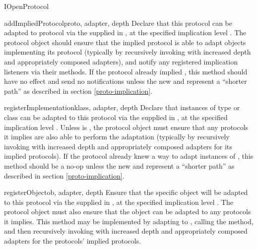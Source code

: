 \begin{verbatim%
}
\begin{verbatim%
}
\begin{verbatim%
}
\begin{verbatim%
}
\begin{verbatim%
}
\begin{verbatim%
}
\begin{classdesc*}{IOpenProtocol}
\begin{methoddesc}{addImpliedProtocol}{proto, adapter, depth}
Declare that this protocol can be adapted to protocol  via the
 supplied in , at the specified implication
level .  The protocol object should ensure that the implied protocol
is able to adapt objects implementing its protocol (typically by recursively
invoking  with increased depth and
appropriately composed adapters), and notify any registered implication
listeners via their  methods.  If the protocol
already implied , this method should have no effect and send no
notifications unless the new  and  represent a
``shorter path'' as described in section \ref{proto-implication}.
\end{methoddesc}

\begin{methoddesc}{registerImplementation}{klass, adapter, depth}
Declare that instances of type or class  can be adapted to this
protocol via the  supplied in , at the
specified implication level .  Unless  is
, the protocol object must ensure that
any protocols it implies are also able to perform the adaptation (typically
by recursively invoking  with increased depth
and appropriately composed adapters for its implied protocols).  If the
protocol already knew a way to adapt instances of , this method
should be a no-op unless the new  and  represent a
``shorter path'' as described in section \ref{proto-implication}.
\end{methoddesc}

\begin{methoddesc}{registerObject}{ob, adapter, depth}
Ensure that the specific object  will be adapted to this protocol via
the  supplied in , at the specified
implication level .  The protocol object must also ensure that the
object can be adapted to any protocols it implies.  This method may be
implemented by adapting  to , calling the
 method, and then recursively invoking
 with increased depth and appropriately
composed adapters for the protocols' implied protocols.
\end{methoddesc}


\end{classdesc*}
\end{verbatim%
}
\end{verbatim%
}
\end{verbatim%
}
\end{verbatim%
}
\end{verbatim%
}
\end{verbatim%
}
